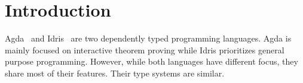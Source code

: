 \documentclass[parskip=half]{scrartcl}
\begin{document}




%


%
%
%



\section{Introduction}

Agda~\cite{agda} and Idris~\cite{idris} are two dependently typed programming
languages.  Agda is mainly focused on interactive theorem proving while Idris
prioritizes general purpose programming.  However, while both languages have
different focus, they share most of their features. Their type systems are
similar.
\end{document}
